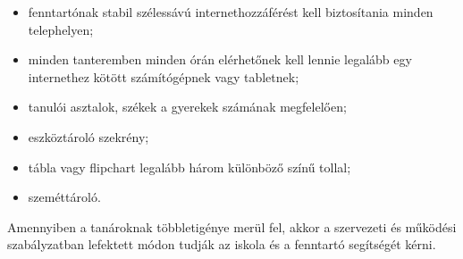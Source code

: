 \begin{itemize}
\tightlist
\item
  fenntartónak stabil szélessávú internethozzáférést kell biztosítania
  minden telephelyen;
\item
  minden tanteremben minden órán elérhetőnek kell lennie legalább egy
  internethez kötött számítógépnek vagy tabletnek;
\item
  tanulói asztalok, székek a gyerekek számának megfelelően;
\item
  eszköztároló szekrény;
\item
  tábla vagy flipchart legalább három különböző színű tollal;
\item
  szeméttároló.
\end{itemize}

Amennyiben a tanároknak többletigénye merül fel, akkor a szervezeti és
működési szabályzatban lefektett módon tudják az iskola és a fenntartó
segítségét kérni.
